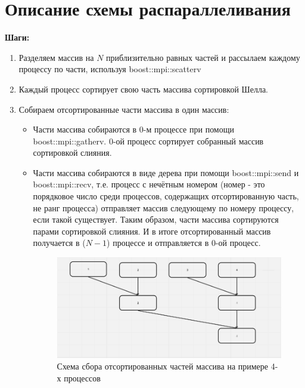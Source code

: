 \documentclass{report}
\begin{document}
\section* {Описание схемы распараллеливания}
\par \textbf{Шаги:} 
\begin{enumerate}
    \item Разделяем массив на ${N}$ приблизительно равных частей и рассылаем каждому процессу по части,  используя boost::mpi::scatterv
    \item Каждый процесс сортирует свою часть массива сортировкой Шелла.
    \item Собираем отсортированные части массива в один массив:
    \begin{itemize}
        \item Части массива собираются в 0-м процессе при помощи boost::mpi::gatherv. 0-ой процесс сортирует собранный массив сортировкой слияния.
        \item Части массива собираются в виде дерева при помощи  boost::mpi::send и  boost::mpi::recv, т.е. процесс с нечётным номером (номер - это порядковое число среди процессов, содержащих отсортированную часть, не ранг процесса) отправляет массив следующему по номеру процессу, если такой существует. Таким образом, части массива сортируются парами сортировкой слияния. И в итоге отсортированный массив получается в (${N-1}$) процессе и отправляется в 0-ой процесс.
        \begin{figure}[h]
            \centering
            \includegraphics[width=1\textwidth]{tree.png}
            \caption{Схема сбора отсортированных частей массива на примере 4-х процессов}
            \label{fig:моя_картинка}
        \end{figure}
    \end{itemize}
\end{enumerate}
\end{document}
